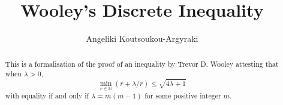 \documentclass[11pt,a4paper]{article}
\begin{document}
\title{Wooley's Discrete Inequality}
\author{Angeliki Koutsoukou-Argyraki}
\maketitle

\begin{abstract}
  This is a formalisation of the proof of an inequality by Trevor D. Wooley attesting that when 
$\lambda > 0$, $$\min_{r \in \mathbb{N}}(r + \lambda/r) \leq \sqrt{4 \lambda +1}$$
with equality if and only if $\lambda = m(m-1)$ for some positive integer $m$.
\end{abstract}

\tableofcontents





\end{document}
